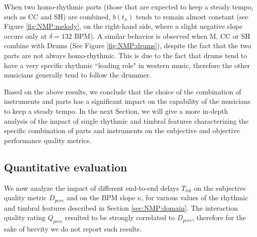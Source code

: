 When two homo-rhythmic parts (those that are expected to keep a steady tempo, such as CC and SH) are combined, $b(t_n)$ tends to remain almost constant (see Figure \ref{fig:NMP:melody}, on the right-hand side, where a slight negative slope occurs only at $\delta=132$ BPM).
A similar behavior is observed when M, CC or SH combine with Drums (See Figure \ref{fig:NMP:drums}), despite the fact that the two parts are not always homo-rhythmic. This is due to the fact that drums tend to have a very specific rhythmic ``leading role" in western music, therefore the other musicians generally tend to follow the drummer.

Based on the above results, we conclude that the choice of the combination of instruments and parts has a significant impact on the capability of the musicians to keep a steady tempo. 
In the next Section, we will give a more in-depth analysis of the impact of single rhythmic and timbral features characterizing the specific combination of parts and instruments on the subjective and objective performance quality metrics.

\subsection{Quantitative evaluation}\label{sec:NMP:quantResults}
We now analyze the impact of different end-to-end delays $T_{tot}$ on the subjective quality metric $D_{perc}$ and on the BPM slope $\kappa$, for various values of the rhythmic and timbral features described in Section \ref{sec:NMP:domain}. The interaction quality rating $Q_{perc}$ resulted to be strongly correlated to $D_{perc}$, therefore for the sake of brevity we do not report such results.


